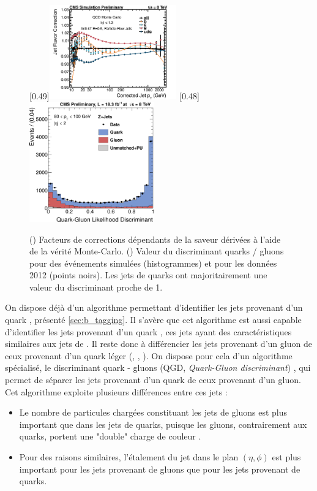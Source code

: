 \begin{figure}[tbp] \centering
    \subcaptionbox{\label{fig:flavor_response}}[0.49\textwidth]{\includegraphics[width=0.49\textwidth]{chapitre4/figs/flavor_response.pdf}}
    \subcaptionbox{\label{fig:qgd}}[0.48\textwidth]{\includegraphics[width=0.48\textwidth]{chapitre4/figs/qgd.pdf}}
    \caption{() Facteurs de corrections dépendants de la saveur dérivées à l'aide de la vérité Monte-Carlo. () Valeur du discriminant quarks / gluons pour des événements simulées (histogrammes) et pour les données 2012 (points noirs). Les jets de quarks ont majoritairement une valeur du discriminant proche de 1.}
\end{figure}

On dispose déjà d'un algorithme permettant d'identifier les jets provenant d'un quark \Pbottom, présenté \cref{sec:b_tagging}. Il s'avère que cet algorithme est aussi capable d'identifier les jets provenant d'un quark \Pcharm, ces jets ayant des caractéristiques similaires aux jets de \Pbottom. Il reste donc à différencier les jets provenant d'un gluon de ceux provenant d'un quark léger (\Pup, \Pdown, \Pstrange). On dispose pour cela d'un algorithme spécialisé, le discriminant quark - gluons (QGD, \emph{Quark-Gluon discriminant}) \citep{CMS-PAS-JME-13-002}, qui permet de séparer les jets provenant d'un quark de ceux provenant d'un gluon. Cet algorithme exploite plusieurs différences entre ces jets :
\begin{itemize}
  \item Le nombre de particules chargées constituant les jets de gluons est plus important que dans les jets de quarks, puisque les gluons, contrairement aux quarks, portent une "double" charge de couleur \citep{Dremin:2000wt}.
  \item Pour des raisons similaires, l'étalement du jet dans le plan $(\eta, \phi)$ est plus important pour les jets provenant de gluons que pour les jets provenant de quarks.
\end{itemize}


